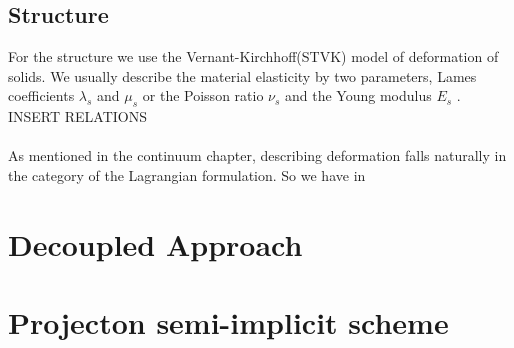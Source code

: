 \subsection{Structure}
For the structure we use the Vernant-Kirchhoff(STVK) model of deformation of solids. We usually describe the material elasticity by two parameters, Lames coefficients $\lambda_s$ and $\mu_s$ or the Poisson ratio $\nu_s$
and the Young modulus $E_s$ \cite{Dunne2006a}. INSERT RELATIONS \\ \\

As mentioned in the continuum chapter, describing deformation falls naturally in the category of the Lagrangian formulation. So we have in 

\section{Decoupled Approach}
\section{Projecton semi-implicit scheme}

